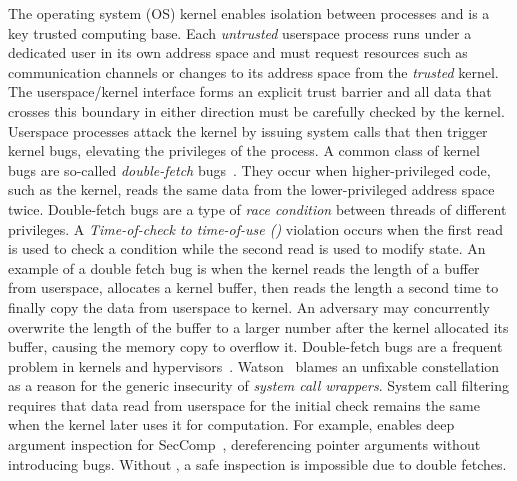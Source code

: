 \documentclass[letterpaper,twocolumn,10pt, anonymous]{article}
\begin{document}
The operating system (OS) kernel enables isolation between processes and is 
a key trusted computing
base. Each \emph{untrusted} userspace process runs under a
dedicated user in its own address space and must request resources such as
communication channels or changes to its address space from the \emph{trusted}
kernel. The userspace/kernel interface forms an explicit trust barrier
and all data that crosses this boundary in either direction must be carefully 
checked by the kernel.
%
Userspace processes attack the kernel by issuing system calls that then trigger
kernel bugs, elevating the privileges of the process.
%
A common class of kernel bugs are so-called \emph{double-fetch}
bugs~\cite{serna08doublefetch, twizsgrakky07ring0, wilhelm2016xenpwn,
wang2018survey}. They occur when higher-privileged code, such as
the kernel, reads the same data from the lower-privileged address space twice.
%
Double-fetch bugs are a type of
\emph{race condition} between threads of different privileges. A
\emph{Time-of-check to time-of-use (\tocttou)} violation occurs when the first
read is used to check a condition while the second read is used to modify
state.
%
An example of a double fetch bug is when the kernel reads the length of a buffer
from userspace, allocates a kernel buffer, then reads the length a second time
to finally copy the data from userspace to kernel. An adversary may concurrently
overwrite the length of the buffer to a larger number after the kernel allocated
its buffer, causing the memory copy to overflow it.
%
Double-fetch bugs are a frequent problem in kernels and
hypervisors~\cite{cve201812633, cve202012652, cve20131332, cve201920610,
cve20158550, cve201610439, cve201610435, cve201610433, cve20195519,
cve20168438}. 
Watson~\cite{watson2007exploiting} blames an unfixable \tocttou
constellation as a reason for the generic insecurity of \emph{system call
wrappers}. System call filtering requires that data read from userspace for the
initial check remains the same when the kernel later uses it for computation. 
For example, \tiktok enables deep argument inspection for 
SecComp~\cite{seccomp_deep, seccomp}, dereferencing pointer arguments without introducing 
\tocttou bugs. Without \tiktok, a safe inspection is impossible due to
double fetches. %
\end{document}

